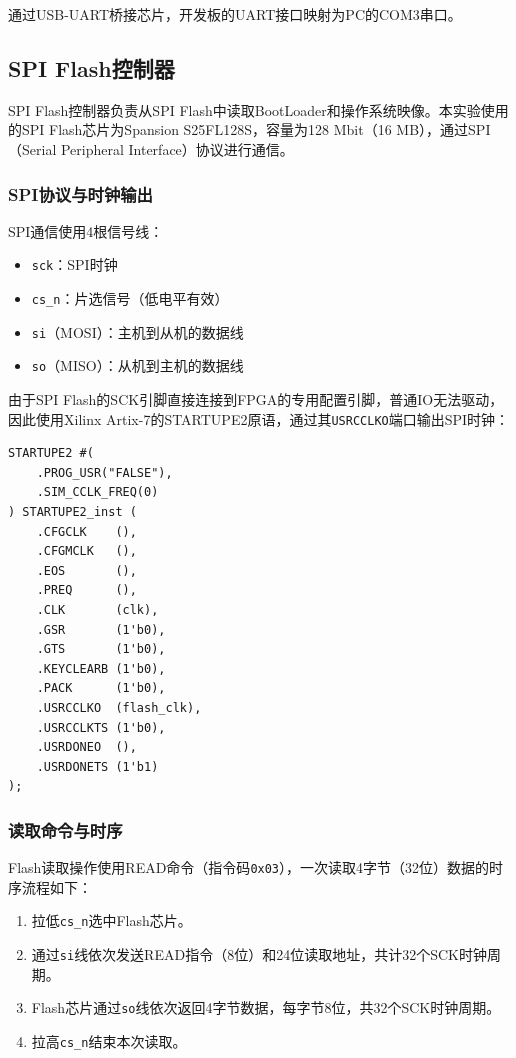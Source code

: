 通过USB-UART桥接芯片，开发板的UART接口映射为PC的COM3串口。

\subsection{SPI Flash控制器}

SPI Flash控制器负责从SPI Flash中读取BootLoader和操作系统映像。本实验使用的SPI Flash芯片为Spansion S25FL128S，容量为128 Mbit（16 MB），通过SPI（Serial Peripheral Interface）协议进行通信。

\subsubsection{SPI协议与时钟输出}

SPI通信使用4根信号线：
\begin{itemize}[leftmargin=2em]
    \item \texttt{sck}：SPI时钟
    \item \texttt{cs\_n}：片选信号（低电平有效）
    \item \texttt{si}（MOSI）：主机到从机的数据线
    \item \texttt{so}（MISO）：从机到主机的数据线
\end{itemize}

由于SPI Flash的SCK引脚直接连接到FPGA的专用配置引脚，普通IO无法驱动，因此使用Xilinx Artix-7的STARTUPE2原语，通过其\texttt{USRCCLKO}端口输出SPI时钟：
\begin{lstlisting}[caption={STARTUPE2原语连接}]
STARTUPE2 #(
    .PROG_USR("FALSE"),
    .SIM_CCLK_FREQ(0)
) STARTUPE2_inst (
    .CFGCLK    (),
    .CFGMCLK   (),
    .EOS       (),
    .PREQ      (),
    .CLK       (clk),
    .GSR       (1'b0),
    .GTS       (1'b0),
    .KEYCLEARB (1'b0),
    .PACK      (1'b0),
    .USRCCLKO  (flash_clk),
    .USRCCLKTS (1'b0),
    .USRDONEO  (),
    .USRDONETS (1'b1)
);
\end{lstlisting}

\subsubsection{读取命令与时序}

Flash读取操作使用READ命令（指令码\texttt{0x03}），一次读取4字节（32位）数据的时序流程如下：

\begin{enumerate}[leftmargin=2em]
    \item 拉低\texttt{cs\_n}选中Flash芯片。
    \item 通过\texttt{si}线依次发送READ指令（8位）和24位读取地址，共计32个SCK时钟周期。
    \item Flash芯片通过\texttt{so}线依次返回4字节数据，每字节8位，共32个SCK时钟周期。
    \item 拉高\texttt{cs\_n}结束本次读取。
\end{enumerate}

